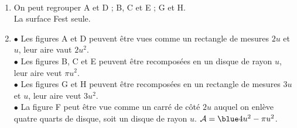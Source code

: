 \ \\ [-5mm]
   \begin{enumerate}
      \item On peut regrouper A et D ; B, C et E ; G et H. \\
         {\blue La surface Fest seule}. \smallskip
      \item \textcolor{G1}{$\bullet$} Les figures A et D peuvent être vues comme un rectangle de mesures $2u$ et $u$, leur aire vaut {\blue $2u^2$}. \\
         \textcolor{G1}{$\bullet$} Les figures B, C et E peuvent être recomposées en un disque de rayon $u$, leur aire veut {\blue $\pi u^2$}. \\
         \textcolor{G1}{$\bullet$} Les figures G et H peuvent être recomposées en un rectangle de mesures $3u$ et $u$, leur aire veut {\blue $3u^2$}. \\
         \textcolor{G1}{$\bullet$} La figure F peut être vue comme un carré de côté $2u$ auquel on enlève quatre quarts de disque, soit un disque de rayon $u$. $\mathcal{A} =\blue 4u^2-\pi u^2$.
   \end{enumerate}
